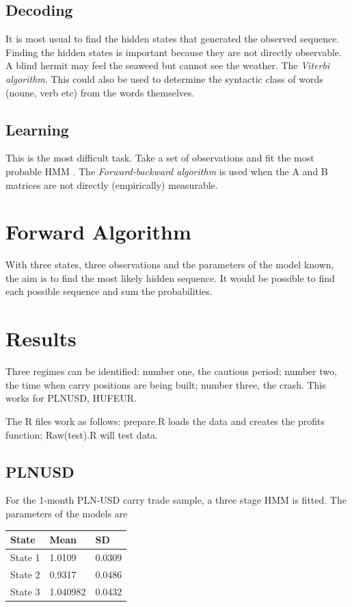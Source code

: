 \documentclass[12pt, a4paper, oneside]{article} %
\begin{document}
\subsection{Decoding}
It is most usual to find the hidden states that generated the observed sequence.  Finding the hidden states is important because they are not directly observable.  A blind hermit may feel the seaweed but cannot see the weather. The \emph{Viterbi algorithm}.  This could also be used to determine the syntactic class of words (noune, verb etc) from the words themselves.  

\subsection{Learning}
This is the most difficult task.  Take a set of observations and fit the most probable HMM . The \emph{Forward-backward algorithm} is used when the A and B matrices are not directly (empirically) measurable.  

\section{Forward Algorithm}
With three states, three observations and the parameters of the model known, the aim is to find the most likely hidden sequence.  It would be possible to find each possible sequence and sum the probabilities.  





\section{Results}
Three regimes can be identified: number one, the cautious period; number two, the time when carry positions are being built; number three, the crash.  This works for PLNUSD, HUFEUR. 

The R files work as follows: prepare.R loads the data and creates the profits function; Raw(test).R will test data. 

\subsection{PLNUSD}
For the 1-month PLN-USD carry trade sample, a three stage HMM is fitted.  The parameters of the models are 

\begin{tabular}{l | l l}
State & Mean & SD \\
\hline
State 1 & 1.0109 & 0.0309\\
State 2 & 0.9317 & 0.0486\\
State 3 & 1.040982 & 0.0432\\
\end{tabular}
\end{document}

